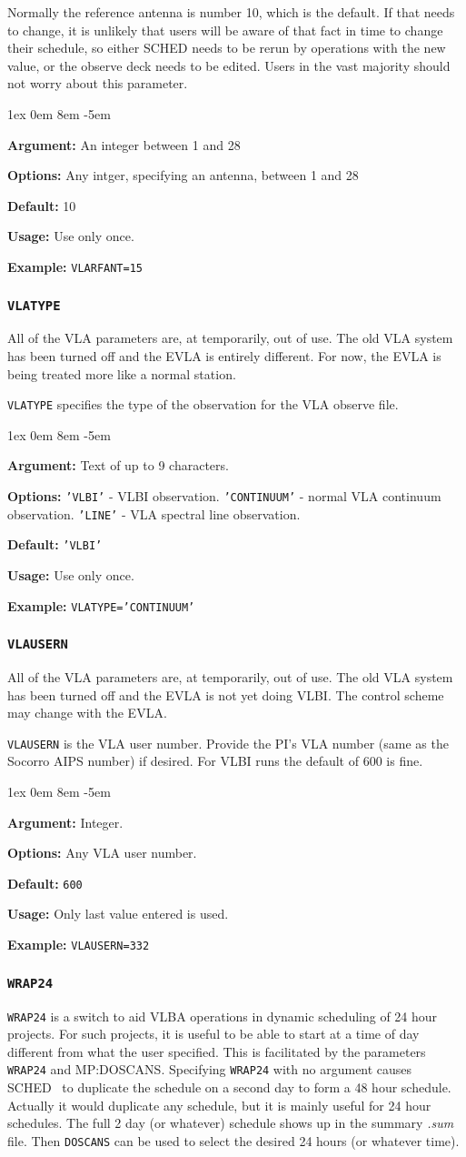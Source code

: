 \documentclass{report}
\newcommand{\schedb}{{\sc SCHED~}}
\newcommand{\rcwbox}[5]{
  \begin{list}{}{\parsep 1ex  \itemsep 0em
                 \leftmargin 8em  \itemindent -5em }
    \item {\bf Argument:} #1
    \item {\bf Options:}  #2
    \item {\bf Default:}  #3
    \item {\bf Usage:}    #4
    \item {\bf Example:}  #5
  \end{list}
}
\begin{document}
Normally the reference antenna is number 10, which is the default.
If that needs to change, it is unlikely that users will be aware of
that fact in time to change their schedule, so either SCHED needs to
be rerun by operations with the new value, or the observe deck needs
to be edited.  Users in the vast majority should not worry about this
parameter.

\rcwbox
{An integer between 1 and 28}
{Any intger, specifying an antenna, between 1 and 28}
{10}
{Use only once.}
{{\tt VLARFANT=15}}



\subsubsection{\label{MP:VLATYPE}{\tt VLATYPE}}

All of the VLA parameters are, at temporarily, out of use.  The old
VLA system has been turned off and the EVLA is entirely different.
For now, the EVLA is being treated more like a normal station.

{\tt VLATYPE} specifies the type of the observation
for the VLA observe file.

\rcwbox
{Text of up to 9 characters.}
{{\tt 'VLBI'}      - VLBI observation.
 {\tt 'CONTINUUM'} - normal VLA continuum observation.
 {\tt 'LINE'}      - VLA spectral line observation.}
{{\tt 'VLBI'}}
{Use only once.}
{{\tt VLATYPE='CONTINUUM'}}


\subsubsection{\label{MP:VLAUSERN}{\tt VLAUSERN}}

All of the VLA parameters are, at temporarily, out of use.  The old
VLA system has been turned off and the EVLA is not yet doing VLBI.
The control scheme may change with the EVLA.

{\tt VLAUSERN} is the VLA user number. Provide the PI's VLA number
(same as the Socorro AIPS number) if desired. For VLBI runs the
default of 600 is fine.

\rcwbox
{Integer.}
{Any VLA user number.}
{{\tt 600}}
{Only last value entered is used.}
{{\tt VLAUSERN=332}}


\subsubsection{\label{MP:WRAP24}{\tt WRAP24}}

{\tt WRAP24} is a switch to aid VLBA operations in dynamic scheduling
of 24 hour projects.  For such projects, it is useful to be able to
start at a time of day different from what the user specified.  This
is facilitated by the parameters {\tt WRAP24} and 
{MP:DOSCANS}.  Specifying {\tt WRAP24} with no argument causes \schedb
to duplicate the schedule on a second day to form a 48 hour schedule.  
Actually it would duplicate any schedule, but it is mainly useful for
24 hour schedules.  The full 2 day (or whatever) schedule shows up in
the summary {\sl .sum} file.  Then {\tt DOSCANS} can be used to select
the desired 24 hours (or whatever time).
\end{document}
